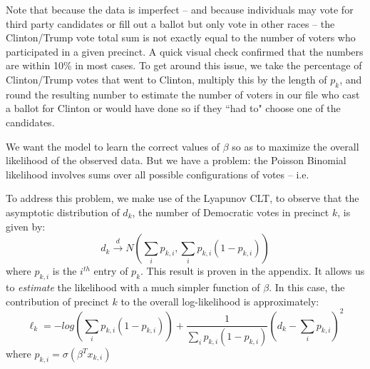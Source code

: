 \documentclass{article}
\begin{document}
Note that because the data is imperfect -- and because individuals may vote for third party candidates or fill out a ballot but only vote in other races -- the Clinton/Trump vote total sum is not exactly equal to the number of voters who participated in a given precinct. A quick visual check confirmed that the numbers are within 10\% in most cases. To get around this issue, we take the percentage of Clinton/Trump votes that went to Clinton, multiply this by the length of $p_k$, and round the resulting number to estimate the number of voters in our file who cast a ballot for Clinton or would have done so if they ``had to" choose one of the candidates. 

We want the model to learn the correct values of $\beta$ so as to maximize the overall likelihood of the observed data. But we have a problem: the Poisson Binomial likelihood involves sums over all possible configurations of votes -- i.e. 

To address this problem, we make use of the Lyapunov CLT, to observe that the asymptotic distribution of $d_k$, the number of Democratic votes in precinct $k$, is given by: 
\[ d_k \stackrel{d} \longrightarrow N \left(\sum_{i} p_{k,i}, \sum_{i} p_{k, i}(1-p_{k, i}) \right) \] 
where $p_{k, i}$ is the $i^{th}$ entry of $p_k$. This result is proven in the appendix. It allows us to \emph{estimate} the likelihood with a much simpler function of $\beta$. In this case, the contribution of precinct $k$ to the overall log-likelihood is approximately: 
\[ \ell_k = -log \left( \sum_{i} p_{k, i}(1-p_{k, i})  \right) + \frac{1}{ \sum_{i} p_{k, i}(1-p_{k, i})} \left( d_k - \sum_{i} p_{k,i}\right)^2  \] 
where $p_{k, i} = \sigma(\beta^T x_{k, i})$
\end{document}
